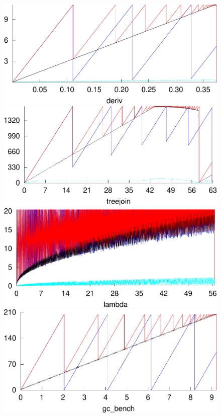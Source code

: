 \documentclass[9pt,preprint,nonatbib]{sigplanconf}
\begin{document}
\begin{figure}[t!]
  \includegraphics[width=\wdh]{deriv.pdf}\\
  \includegraphics[width=\wdh]{treejoin.pdf}
  \includegraphics[width=\wdh]{lambda.pdf}
  \includegraphics[width=\wdh]{gc_bench.pdf}

\end{figure}
\end{document}
